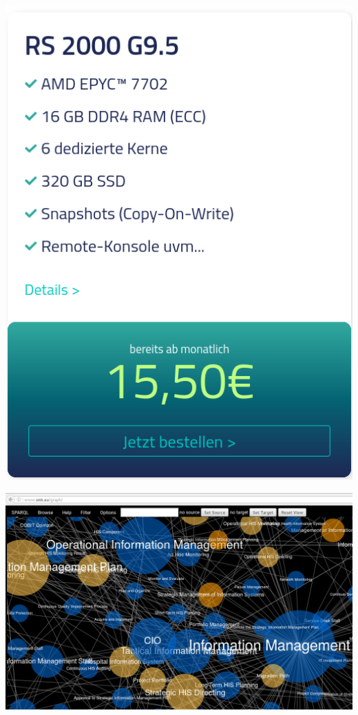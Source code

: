 \documentclass[14pt,aspectratio=1610]{beamer}
\begin{document}
\begin{frame}{}
\centering\includegraphics[width=1.05\textwidth,height=1.05\textheight,keepaspectratio]{img/netcup.png}
\end{frame}

\begin{frame}{}
\centering\includegraphics[width=1.05\textwidth,height=1.05\textheight,keepaspectratio]{../../2016/snik-projekttreffen/img/browser.png}
\end{frame}
\end{document}
